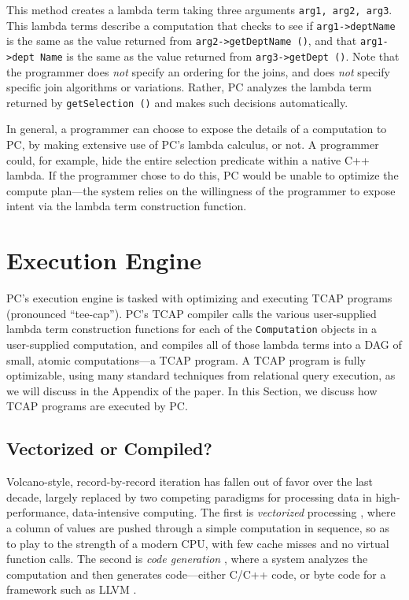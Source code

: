 \noindent
This method creates a lambda term taking three arguments \texttt{arg1, arg2, arg3}.  This lambda terms describe a computation that
checks to see if \texttt{arg1->deptName} is the same as the value
returned from \texttt{arg2->getDeptName ()}, and
that \texttt{arg1->dept Name} is the same as the value returned from \texttt{arg3}\-\texttt{->getDept ()}. 
Note that the programmer does \emph{not} specify an ordering for the joins, and does \emph{not} specify specific join algorithms or variations.  Rather, PC
analyzes the lambda term returned by \texttt{getSelection ()} and
makes such decisions automatically.

In general, a programmer can choose to expose the details of a computation to PC, by making extensive use of PC's lambda
calculus, or not.  A programmer could, for example, hide the entire selection predicate within a native C++ lambda.
If the programmer chose to do this, PC would be unable to optimize the compute plan---the system relies on the willingness of the 
programmer to expose intent via the lambda term construction function.

\section{Execution Engine}
\label{sec:engine}

PC's execution engine is tasked with optimizing and executing TCAP programs (pronounced ``tee-cap'').  
PC's TCAP compiler
calls the various user-supplied lambda term construction functions for each of the \texttt{Computation} objects in a
user-supplied computation,
and compiles all of those lambda terms into a DAG of small, atomic computations---a TCAP program.
A TCAP program is fully optimizable, using many standard techniques from relational query execution, as we
will discuss in the Appendix of the paper.
In this Section, we discuss how TCAP programs are executed by PC.

\subsection{Vectorized or Compiled?}
Volcano-style, record-by-record iteration \cite{graefe1990encapsulation} has fallen out of favor over the last decade, largely replaced by
two competing paradigms for processing data
in high-performance, data-intensive computing.  The first is \emph{vectorized} processing \cite{abadi2009column, boncz2005monetdb, zukowski2005monetdb, idreos2012monetdb}, where a column of values are pushed
through a simple computation in sequence, so as to play to the strength of a modern CPU, with few cache misses and no virtual
function calls.  The second is \emph{code generation} \cite{neumann2011efficiently, nagel2014code, bress2017generating, klonatos2014building, ahmad2009dbtoaster}, where a system analyzes the computation
and then generates code---either C/C++ code, or byte code for a framework such as LLVM \cite{lattner2004llvm, lattner2002llvm}.

